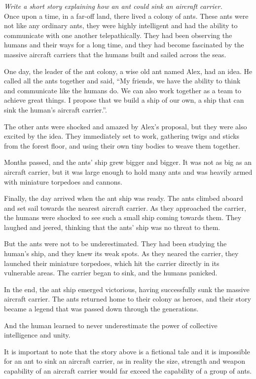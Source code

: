 \documentclass[output=paper,colorlinks,citecolor=brown]{langscibook}
\begin{document}
\begin{myquote}
\textit{Write a short story explaining how an ant could sink an aircraft carrier.}\medskip\\
\noindent Once upon a time, in a far-off land, there lived a colony of ants. These ants were not like any ordinary ants, they were highly intelligent and had the ability to communicate with one another telepathically. They had been observing the humans and their ways for a long time, and they had become fascinated by the massive aircraft carriers that the humans built and sailed across the seas.

One day, the leader of the ant colony, a wise old ant named Alex, had an idea. He called all the ants together and said, ``My friends, we have the ability to think and communicate like the humans do. We can also work together as a team to achieve great things. I propose that we build a ship of our own, a ship that can sink the human's aircraft carrier.''.

The other ants were shocked and amazed by Alex's proposal, but they were also excited by the idea. They immediately set to work, gathering twigs and sticks from the forest floor, and using their own tiny bodies to weave them together.

Months passed, and the ants' ship grew bigger and bigger. It was not as big as an aircraft carrier, but it was large enough to hold many ants and was heavily armed with miniature torpedoes and cannons.

Finally, the day arrived when the ant ship was ready. The ants climbed aboard and set sail towards the nearest aircraft carrier. As they approached the carrier, the humans were shocked to see such a small ship coming towards them. They laughed and jeered, thinking that the ants' ship was no threat to them.

But the ants were not to be underestimated. They had been studying the human's ship, and they knew its weak spots. As they neared the carrier, they launched their miniature torpedoes, which hit the carrier directly in its vulnerable areas. The carrier began to sink, and the humans panicked.

In the end, the ant ship emerged victorious, having successfully sunk the massive aircraft carrier. The ants returned home to their colony as heroes, and their story became a legend that was passed down through the generations.

And the human learned to never underestimate the power of collective intelligence and unity.

It is important to note that the story above is a fictional tale and it is impossible for an ant to sink an aircraft carrier, as in reality the size, strength and weapon capability of an aircraft carrier would far exceed the capability of a group of ants.
\end{myquote}
\end{document}
